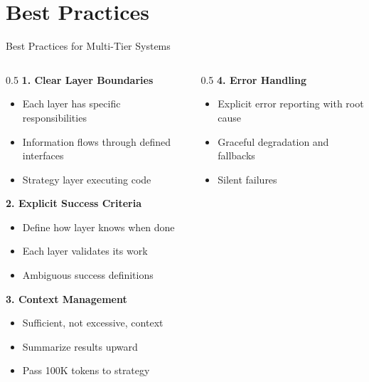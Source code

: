\documentclass[aspectratio=169,11pt]{beamer}
\begin{document}
\section{Best Practices}

\begin{frame}{Best Practices for Multi-Tier Systems}
    \begin{columns}[T]
        \begin{column}{0.5\textwidth}
            \textbf{1. Clear Layer Boundaries}
            \begin{itemize}
                \item[\checkmark] Each layer has specific responsibilities
                \item[\checkmark] Information flows through defined interfaces
                \item[$\times$] Strategy layer executing code
            \end{itemize}

            \vspace{0.2cm}
            \textbf{2. Explicit Success Criteria}
            \begin{itemize}
                \item[\checkmark] Define how layer knows when done
                \item[\checkmark] Each layer validates its work
                \item[$\times$] Ambiguous success definitions
            \end{itemize}

            \vspace{0.2cm}
            \textbf{3. Context Management}
            \begin{itemize}
                \item[\checkmark] Sufficient, not excessive, context
                \item[\checkmark] Summarize results upward
                \item[$\times$] Pass 100K tokens to strategy
            \end{itemize}
        \end{column}
        \begin{column}{0.5\textwidth}
            \textbf{4. Error Handling}
            \begin{itemize}
                \item[\checkmark] Explicit error reporting with root cause
                \item[\checkmark] Graceful degradation and fallbacks
                \item[$\times$] Silent failures
            \end{itemize}


\end{column}
\end{columns}
\end{frame}
\end{document}
